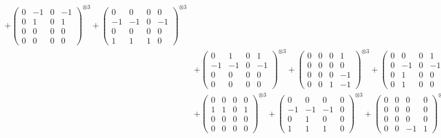 \documentclass{article}
\begin{document}
{\begin{align}
            + \begin{pmatrix} 0 & -1 & 0 & -1 \\ 0 & 1 & 0 & 1 \\ 0 & 0 & 0 & 0 \\ 0 & 0 & 0 & 0 \end{pmatrix}^{\otimes 3} 
            + \begin{pmatrix} 0 & 0 & 0 & 0 \\ -1 & -1 & 0 & -1 \\ 0 & 0 & 0 & 0 \\ 1 & 1 & 1 & 0 \end{pmatrix}^{\otimes 3} \\
        &+ \label{Rs16-Rc11-Solution-13-c10} \begin{pmatrix} 0 & 1 & 0 & 1 \\ -1 & -1 & 0 & -1 \\ 0 & 0 & 0 & 0 \\ 0 & 0 & 0 & 0 \end{pmatrix}^{\otimes 3} 
            + \begin{pmatrix} 0 & 0 & 0 & 1 \\ 0 & 0 & 0 & 0 \\ 0 & 0 & 0 & -1 \\ 0 & 0 & 1 & -1 \end{pmatrix}^{\otimes 3} 
            + \begin{pmatrix} 0 & 0 & 0 & 1 \\ 0 & -1 & 0 & -1 \\ 0 & 1 & 0 & 0 \\ 0 & 1 & 0 & 0 \end{pmatrix}^{\otimes 3} \\
        &+ \label{Rs16-Rc11-Solution-13-c13} \begin{pmatrix} 0 & 0 & 0 & 0 \\ 1 & 1 & 0 & 1 \\ 0 & 0 & 0 & 0 \\ 0 & 0 & 0 & 0 \end{pmatrix}^{\otimes 3} 
            + \begin{pmatrix} 0 & 0 & 0 & 0 \\ -1 & -1 & -1 & 0 \\ 0 & 1 & 0 & 0 \\ 1 & 1 & 1 & 0 \end{pmatrix}^{\otimes 3} 
            + \begin{pmatrix} 0 & 0 & 0 & 0 \\ 0 & 0 & 0 & 0 \\ 0 & 0 & 0 & 0 \\ 0 & 0 & -1 & 1 \end{pmatrix}^{\otimes 3} \\

\end{align}}
\end{document}
